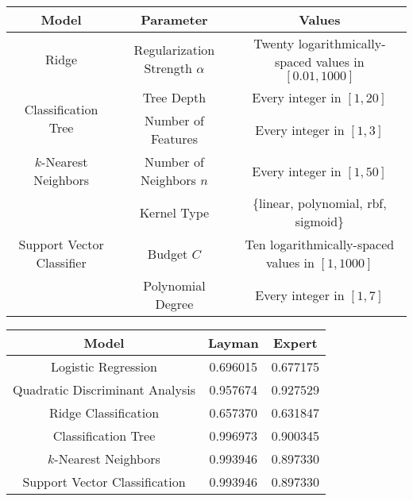 \documentclass{article}
\begin{document}
\begin{table}[p]
\centering
\color{DarkBlue}
\begin{tabular}{|c|c|c|}
\hline
\textbf{Model}                             & \textbf{Parameter}               & \textbf{Values} \\ \hline
Ridge                                      & Regularization Strength $\alpha$ & Twenty logarithmically-spaced values in $[0.01,1000]$ \\ \hline
\multirow{2}{*}{Classification Tree}       & Tree Depth                       & Every integer in $[1,20]$                             \\
                                           & Number of Features               & Every integer in $[1,3]$                              \\ \hline
$k$-Nearest Neighbors                      & Number of Neighbors $n$          & Every integer in $[1,50]$                             \\ \hline
\multirow{3}{*}{Support Vector Classifier} & Kernel Type                      & \{linear, polynomial, rbf, sigmoid\}                  \\ 
                                           & Budget $C$                       & Ten logarithmically-spaced values in $[1, 1000]$      \\
                                           & Polynomial Degree                & Every integer in $[1,7]$                              \\ \hline
\end{tabular}
\end{table}

\begin{table}[p]
\centering
\color{DarkBlue}
\begin{tabular}{|c|c|c|}
\hline
\textbf{Model}                  & \textbf{Layman} & \textbf{Expert} \\
\hline
Logistic Regression             & 0.696015        & 0.677175 \\
Quadratic Discriminant Analysis & 0.957674        & 0.927529 \\
Ridge Classification            & 0.657370        & 0.631847 \\
Classification Tree             & 0.996973        & 0.900345 \\
$k$-Nearest Neighbors           & 0.993946        & 0.897330 \\
Support Vector Classification   & 0.993946        & 0.897330 \\
\hline
\end{tabular}
\end{table}
\end{document}
